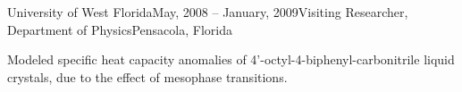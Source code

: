\begin{rSubsection}{University of West Florida}{May, 2008 -- January, 2009}{Visiting Researcher, Department of Physics}{Pensacola, Florida}
\item Modeled specific heat capacity anomalies of 4'-octyl-4-biphenyl-carbonitrile liquid crystals, due to the effect of mesophase transitions.
\end{rSubsection}